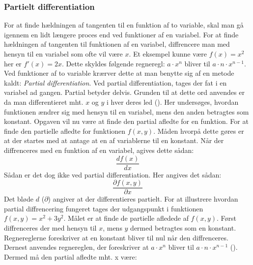 \subsubsection{Partielt differentiation}\label{sec:PartieltDifferentiation}
For at finde hældningen af tangenten til en funktion af to variable, skal man gå igennem en lidt længere proces end ved funktioner af en variabel. For at finde hældningen af tangenten til funktionen af en variabel, diffrencere man med hensyn til en variabel som ofte vil være $x$. Et eksempel kunne være $f(x) = x^2$ her er $f'(x) = 2x$. Dette skyldes følgende regneregl: $a \cdot x^n$ bliver til $a \cdot n \cdot x^{n-1}$. \\ Ved funktioner af to variable krærver dette at man benytte sig af en metode kaldt: \textit{Partial differentiation}. Ved partial differentiation, tages der fat i en variabel ad gangen. Partial betyder delvis. Grunden til at dette ord anvendes er da man differentieret mht. $x$ og $y$ i hver deres led (\cite[4]{Larsen2016}). Her undersøges, hvordan funktionen ændrer sig med hensyn til en variabel, mens den anden betragtes som konstant. Opgaven vil nu være at finde den partial afledte for en funktion. For at finde den partielle afledte for funktionen $f(x,y)$. Måden hvorpå dette gøres er at der startes med at antage at en af variablerne til en konstant. Når der diffrenceres med en funktion af en variabel, agives dette sådan: \begin{equation}\frac{d f(x)}{d x}\end{equation} Sådan er det dog ikke ved partial differentiation. Her angives det sådan: \begin{equation}\frac{\partial f(x,y)}{\partial x}\end{equation} 
Det bløde $d$ (\begin{math}\partial\end{math}) angiver at der differentieres partielt. For at illustrere hvordan partial diffrencering fungeret tages der udgangspunkt i funktionen $f(x,y) = x^2 + 3y^2$. Målet er at finde de partielle afledede af $f(x,y)$. Først diffrenceres der med hensyn til $x$, mens $y$ dermed betragtes som en konstant. Regnereglerne foreskriver at en konstant bliver til nul når den diffrenceres. Dernest anvendes regnereglen, der foreskriver at \begin{math}a \cdot x^n\end{math} bliver til \begin{math}a \cdot n \cdot x^{n-1}\end{math} (\cite[14]{Pihl2019}). Dermed må den partial afledte mht. x være: 
